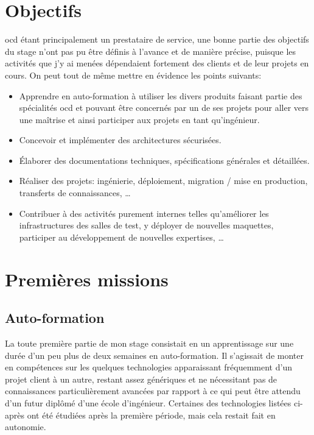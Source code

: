 \documentclass[12pt, oneside, a4paper, titlepage]{report}
\begin{document}
\section{Objectifs}%
\label{sec:mission::objectifs}

\acrlong{ocd} étant principalement un prestataire de service, une bonne partie
des objectifs du stage n'ont pas pu être définis à l'avance et de manière
précise, puisque les activités que j'y ai menées dépendaient fortement des
clients et de leur projets en cours. On peut tout de même mettre en évidence les
points suivants:

\begin{itemize}
    \item Apprendre en auto-formation à utiliser les divers produits faisant
        partie des spécialités \gls{ocd} et pouvant être concernés par un de ses
        projets pour aller vers une maîtrise et ainsi participer aux projets en
        tant qu'ingénieur.
    \item Concevoir et implémenter des architectures sécurisées.
    \item Élaborer des documentations techniques, spécifications générales et
        détaillées.
    \item Réaliser des projets: ingénierie, déploiement, migration / mise en
        production, transferts de connaissances, \ldots{}
    \item Contribuer à des activités purement internes telles qu'améliorer les
        infrastructures des salles de test, y déployer de nouvelles maquettes,
        participer au développement de nouvelles expertises, \ldots{}
\end{itemize}


\section{Premières missions}%
\label{sec:mission::prems}

\subsection{Auto-formation}%
\label{sub:mission::prems::auto-formation}

La toute première partie de mon stage consistait en un apprentissage sur une
durée d'un peu plus de deux semaines en auto-formation. Il s'agissait de monter
en compétences sur les quelques technologies apparaissant fréquemment d'un
projet client à un autre, restant assez génériques et ne nécessitant pas de
connaissances particulièrement avancées par rapport à ce qui peut être attendu
d'un futur diplômé d'une école d'ingénieur. Certaines des technologies listées
ci-après ont été étudiées après la première période, mais cela restait fait en
autonomie.
\end{document}
